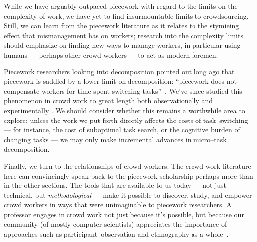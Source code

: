 \documentclass[trackingWork]{subfiles}
\begin{document}
While we have arguably outpaced piecework with regard to the limits on the complexity of work,
we have yet to find insurmountable limits to crowdsourcing.
Still, we can learn from the piecework literature as it relates to
the stymieing effect that mismanagement has on workers;
research into the complexity limits should emphasize on finding new ways to manage workers,
in particular using humans --- perhaps other crowd workers ---
to act as modern foremen.

Piecework researchers looking into decomposition pointed out long ago that
piecework is saddled by a lower limit on decomposition:
``piecework does not compensate workers for time spent switching tasks''~\cite{bewley1999wages}.
We've since studied this phenomenon in crowd work to great length both
observationally \cite{taskSearch} and
experimentally \cite{delayAndOrderLasecki}.
We should consider whether this remains a worthwhile area to explore; %
unless the work we put forth directly affects the costs of task--switching
--- for instance, the cost of suboptimal task search, or the cognitive burden of changing tasks ---
we may only make incremental advances in micro--task decomposition.

Finally, we turn to the relationships of crowd workers.
The crowd work literature here can convincingly speak back to
the piecework scholarship perhaps more than in the other sections.
The tools that are available to us today
--- not just technical, but \textit{methodological} ---
make it possible to
discover,
study, and
empower 
crowd workers in ways that were unimaginable to piecework researchers.
A professor engages in crowd work \cite{bighamHalfWorkday}
not just because it's possible, but because our community
(of mostly computer scientists)
appreciates the importance of approaches such as participant--observation and ethnography as a whole~\cite{olson2014ways}.




\onlyinsubfile{
  \balance{}
  \printbibliography
}
\end{document}
